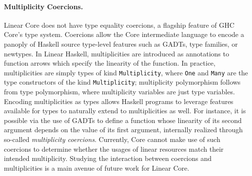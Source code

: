 \documentclass[acmsmall,review,screen]{acmart}
\newcommand{\incode}[1]{\lstinline{#1}}
\begin{document}
\paragraph{Multiplicity Coercions.}
Linear Core does not have type equality coercions, a flagship feature of GHC
Core's type system.
%
Coercions %
allow the Core intermediate language to encode a panoply of Haskell source
type-level features such as GADTs, type families, or newtypes.
%
In Linear Haskell, multiplicities are introduced as annotations to function
arrows which specify the linearity of the function. In practice,
multiplicities are simply types of kind \incode{Multiplicity}, where \incode{One} and \incode{Many}
are the type constructors of the kind \incode{Multiplicity}; multiplicity polymorphism
follows from type polymorphism, where multiplicity variables are
just type variables. Encoding multiplicities as types allows Haskell programs
to leverage features available for types to naturally extend to multiplicities
as well.
For instance, it is possible via the use of GADTs to define a
function whose linearity of its second argument depends on the value
of its first argument, internally realized through so-called
\emph{multiplicity coercions}. Currently, Core cannot make use of such
coercions to determine whether the usages of linear resources match
their intended multiplicity. Studying the interaction between coercions and multiplicities is a main avenue
of future work for Linear Core.
%


\end{document}
